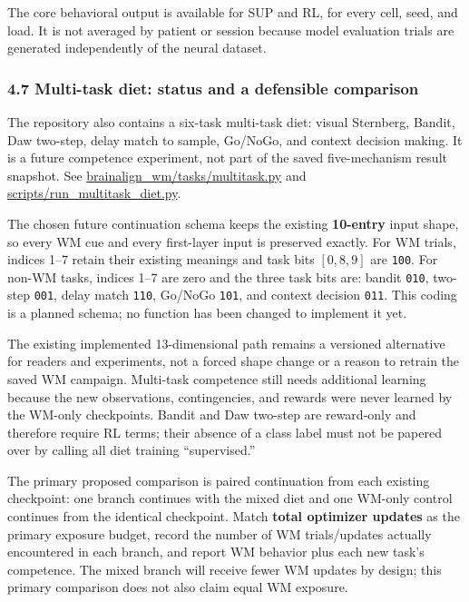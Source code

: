 \documentclass[
  10pt,
]{article}
\begin{document}
The core behavioral output is available for SUP and RL, for every cell,
seed, and load. It is not averaged by patient or session because model
evaluation trials are generated independently of the neural dataset.

\hypertarget{multi-task-diet-status-and-a-defensible-comparison}{%
\subsubsection{4.7 Multi-task diet: status and a defensible
comparison}\label{multi-task-diet-status-and-a-defensible-comparison}}

The repository also contains a six-task multi-task diet: visual
Sternberg, Bandit, Daw two-step, delay match to sample, Go/NoGo, and
context decision making. It is a future competence experiment, not part
of the saved five-mechanism result snapshot. See
\url{brainalign_wm/tasks/multitask.py} and
\url{scripts/run_multitask_diet.py}.

The chosen future continuation schema keeps the existing
\textbf{10-entry} input shape, so every WM cue and every first-layer
input is preserved exactly. For WM trials, indices 1--7 retain their
existing meanings and task bits \([0,8,9]\) are \texttt{100}. For non-WM
tasks, indices 1--7 are zero and the three task bits are: bandit
\texttt{010}, two-step \texttt{001}, delay match \texttt{110}, Go/NoGo
\texttt{101}, and context decision \texttt{011}. This coding is a
planned schema; no function has been changed to implement it yet.

The existing implemented 13-dimensional path remains a versioned
alternative for readers and experiments, not a forced shape change or a
reason to retrain the saved WM campaign. Multi-task competence still
needs additional learning because the new observations, contingencies,
and rewards were never learned by the WM-only checkpoints. Bandit and
Daw two-step are reward-only and therefore require RL terms; their
absence of a class label must not be papered over by calling all diet
training ``supervised.''

The primary proposed comparison is paired continuation from each
existing checkpoint: one branch continues with the mixed diet and one
WM-only control continues from the identical checkpoint. Match
\textbf{total optimizer updates} as the primary exposure budget, record
the number of WM trials/updates actually encountered in each branch, and
report WM behavior plus each new task's competence. The mixed branch
will receive fewer WM updates by design; this primary comparison does
not also claim equal WM exposure.
\end{document}
